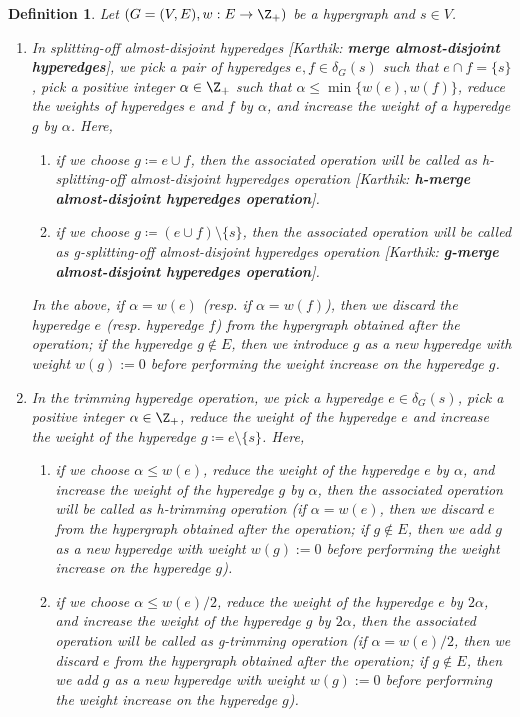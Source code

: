 \documentclass{article}
\newtheorem{definition}{Definition}[section]
\newcommand{\knote}[1]{{\color{red}[{\tiny Karthik: \bf #1}]\marginpar{\color{red}*}}}
\begin{document}
\iffalse
\begin{definition}\label{defn:splitting-off}
    Let $(G=(V, E), w: E\rightarrow \Z_+)$ be a hypergraph and $s\in V$. 
    \begin{enumerate}
        
        
        \item 
        In \emph{splitting-off almost-disjoint hyperedges} \knote{\emph{merge almost-disjoint hyperedges}}, we pick a pair of hyperedges $e, f\in \delta_G(s)$ such that $e\cap f=\{s\}$, pick a positive integer $\alpha \in \Z_+$ such that $\alpha\le \min\{w(e), w(f)\}$, reduce the weights of hyperedges $e$ and $f$ by $\alpha$, and increase the weight of a hyperedge $g$ by $\alpha$. Here, 
        \begin{enumerate}
            \item if we choose $g\coloneqq e \cup f$, then the associated operation will be called as \emph{h-splitting-off almost-disjoint hyperedges operation} \knote{\emph{h-merge almost-disjoint hyperedges operation}}.
            \item if we choose $g\coloneqq (e\cup f)\setminus \{s\}$, then the associated operation will be called as \emph{g-splitting-off almost-disjoint hyperedges operation} \knote{\emph{g-merge almost-disjoint hyperedges operation}}.
        \end{enumerate}
        In the above, if $\alpha=w(e)$ (resp. if $\alpha = w(f)$), then we discard the hyperedge $e$ (resp. hyperedge $f$) from the hypergraph obtained after the operation; if the hyperedge $g\not\in E$, then we introduce $g$ as a new hyperedge with weight $w(g) := 0$ before performing the weight increase on the hyperedge $g$.
    
        \item 
        In the \emph{trimming hyperedge operation}, we pick a hyperedge $e\in \delta_G(s)$, pick a positive integer $\alpha \in \Z_+$,
        reduce the weight of the hyperedge $e$ and 
        increase the weight of the hyperedge $g\coloneqq e\setminus \{s\}$. Here, 
        \begin{enumerate}
            \item if we choose $\alpha \le w(e)$, reduce the weight of the hyperedge $e$ by $\alpha$,  and increase the weight of the hyperedge $g$ by $\alpha$, then the associated operation will be called as \emph{h-trimming operation} (if $\alpha=w(e)$, then we discard $e$ from the hypergraph obtained after the operation; if $g\not\in E$, then we add $g$ as a new hyperedge with weight $w(g) := 0$ before performing the weight increase on the hyperedge $g$). 
            \item if we choose $\alpha \le w(e)/2$, reduce the weight of the hyperedge $e$ by $2\alpha$, and increase the weight of the hyperedge $g$ by $2\alpha$, then the associated operation will be called as \emph{g-trimming operation} (if $\alpha=w(e)/2$, then we discard $e$ from the hypergraph obtained after the operation; if $g\not\in E$, then we add $g$ as a new hyperedge with weight $w(g) := 0$ before performing the weight increase on the hyperedge $g$).  
        \end{enumerate}


\end{enumerate}
\end{definition}
\end{document}
